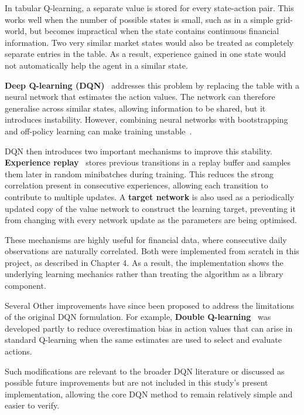 In tabular Q-learning, a separate value is stored for every state-action
pair. This works well when the number of possible states is small, such
as in a simple grid-world, but becomes impractical when the state
contains continuous financial information. Two very similar market
states would also be treated as completely separate entries in the
table. As a result, experience gained in one state would not
automatically help the agent in a similar state.

\textbf{Deep Q-learning (DQN)}~\cite{mnih2015} addresses this problem by
replacing the table with a neural network that estimates the action
values. The network can therefore generalise across similar states,
allowing information to be shared, but it introduces instability.
However, combining neural networks with bootstrapping and off-policy
learning can make training unstable~\cite{tsitsiklis1997, sutton2018}.

DQN then introduces two important mechanisms to improve this stability.
\textbf{Experience replay}~\cite{lin1992} stores previous transitions in a
replay buffer and samples them later in random minibatches during
training. This reduces the strong correlation present in consecutive
experiences, allowing each transition to contribute to multiple updates.
A \textbf{target network} is also used as a periodically updated copy of
the value network to construct the learning target, preventing it from
changing with every network update as the parameters are being
optimised.

These mechanisms are highly useful for financial data, where consecutive
daily observations are naturally correlated. Both were implemented from
scratch in this project, as described in Chapter 4. As a result, the
implementation shows the underlying learning mechanics rather than
treating the algorithm as a library component.

Several Other improvements have since been proposed to address the
limitations of the original DQN formulation. For example, \textbf{Double
Q-learning}~\cite{vanhasselt2016} was developed partly to reduce overestimation bias
in action values that can arise in standard Q-learning when the same
estimates are used to select and evaluate actions.

Such modifications are relevant to the broader DQN literature or
discussed as possible future improvements but are not included in this
study's present implementation, allowing the core DQN method to remain
relatively simple and easier to verify.

